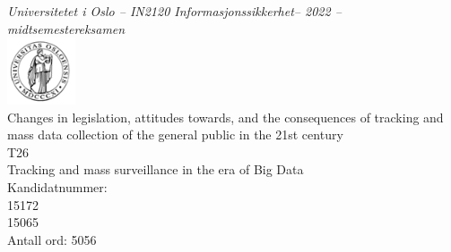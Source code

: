 \documentclass[11pt]{article}
\newcommand{\tittel}{Changes in legislation, attitudes towards, and the consequences of tracking and mass data collection of the general public in the 21st century}
\newcommand{\temanr}{T26} %
\newcommand{\tematittel}{Tracking and mass surveillance in the era of Big Data} %
\newcommand{\kandidatnrforside}{15172 \\ 15065}  %
\newcommand{\antallord}{5056} %
{\hspace{-1mm}}
\begin{document}
 \thispagestyle{empty}
\begin{center}
\normalsize{\textit{Universitetet i Oslo -- IN2120 Informasjonssikkerhet-- 2022 -- midtsemestereksamen}} \\
\vspace{1cm}
\includegraphics[width=0.15\textwidth]{uio_logo.png} \\
\vspace{1cm}
\huge{\tittel} \\
\Large{\temanr} \\
\Large{\tematittel} \\
\vspace{1cm}
\Large{Kandidatnummer:} \\
\large{\kandidatnrforside} \\
\vspace{1cm}
\Large{Antall ord: \antallord} \\
\end{center}
\tableofcontents
\newpage


\end{document}
